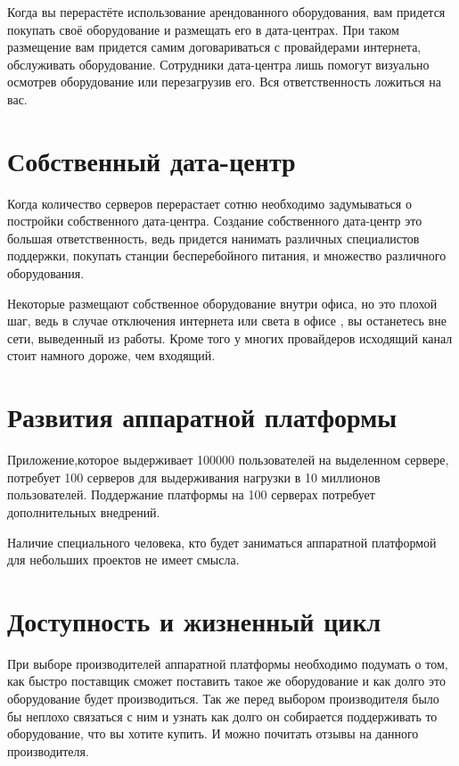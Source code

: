 Когда вы перерастёте использование арендованного оборудования, вам придется покупать своё оборудование и размещать его в дата-центрах. При таком размещение вам придется самим договариваться с провайдерами интернета, обслуживать оборудование. Сотрудники дата-центра лишь помогут визуально осмотрев оборудование или перезагрузив его. Вся ответственность ложиться на вас.


\section{ Собственный дата-центр } \label{sect2_10}

Когда количество серверов перерастает сотню необходимо задумываться о постройки собственного дата-центра. Создание собственного дата-центр это большая ответственность, ведь придется нанимать различных специалистов поддержки, покупать станции бесперебойного питания, и множество различного оборудования.

Некоторые размещают собственное оборудование внутри офиса, но это плохой шаг, ведь в случае отключения интернета или света в офисе , вы останетесь вне сети, выведенный из работы. Кроме того у многих провайдеров исходящий канал стоит намного дороже, чем входящий.

\section{ Развития аппаратной платформы } \label{sect2_11}

Приложение,которое выдерживает 100000 пользователей на выделенном сервере, потребует 100 серверов для выдерживания нагрузки в 10 миллионов пользователей. Поддержание платформы на 100 серверах потребует дополнительных внедрений.

Наличие специального человека, кто будет заниматься аппаратной платформой для небольших проектов не имеет смысла.


\section{ Доступность и жизненный цикл } \label{sect2_12}

При выборе производителей аппаратной платформы необходимо подумать о том, как быстро поставщик сможет поставить такое же оборудование и как долго это оборудование будет производиться. Так же перед выбором производителя  было бы неплохо связаться с ним и узнать как долго он собирается поддерживать то оборудование, что вы хотите купить. И можно почитать отзывы на данного производителя.

